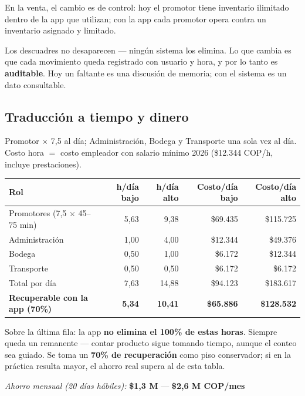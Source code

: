 \documentclass[11pt,a4paper]{article}
\begin{document}
En la venta, el cambio es de control: hoy el promotor tiene inventario ilimitado
dentro de la app que utilizan; con la app cada promotor opera contra un inventario
asignado y limitado.

Los descuadres no desaparecen --- ningún sistema los elimina. Lo que cambia es que
cada movimiento queda registrado con usuario y hora, y por lo tanto es
\textbf{auditable}. Hoy un faltante es una discusión de memoria; con el sistema es
un dato consultable.

\subsection*{Traducción a tiempo y dinero}

Promotor $\times$ 7,5 al día; Administración, Bodega y Transporte una sola vez al día.
Costo hora $=$ costo empleador con salario mínimo 2026 (\$12.344 COP/h, incluye
prestaciones).

\begin{center}
\begin{tabular}{lrrrr}
\toprule
\sffamily\bfseries Rol & \sffamily\bfseries h/día bajo & \sffamily\bfseries h/día alto & \sffamily\bfseries Costo/día bajo & \sffamily\bfseries Costo/día alto \\
\midrule
Promotores (7,5 $\times$ 45--75 min) & 5,63 & 9,38 & \$69.435 & \$115.725 \\
Administración & 1,00 & 4,00 & \$12.344 & \$49.376 \\
Bodega & 0,50 & 1,00 & \$6.172 & \$12.344 \\
Transporte & 0,50 & 0,50 & \$6.172 & \$6.172 \\
\midrule
Total por día & 7,63 & 14,88 & \$94.123 & \$183.617 \\
\midrule
\textbf{Recuperable con la app (70\%)} & \textbf{5,34} & \textbf{10,41} & \textbf{\$65.886} & \textbf{\$128.532} \\
\bottomrule
\end{tabular}
\end{center}

\vspace{4pt}
\noindent\small Sobre la última fila: la app \textbf{no elimina el 100\% de estas horas}.
Siempre queda un remanente --- contar producto sigue tomando tiempo, aunque el conteo
sea guiado. Se toma un \textbf{70\% de recuperación} como piso conservador; si en la
práctica resulta mayor, el ahorro real supera al de esta tabla.\normalsize

\vspace{8pt}
\begin{center}
\textit{Ahorro mensual (20 días hábiles):}\quad
{\sffamily\large\bfseries\color{vino} \$1,3 M} --- {\sffamily\large\bfseries\color{vino}\$2,6 M COP/mes}
\end{center}
\end{document}
